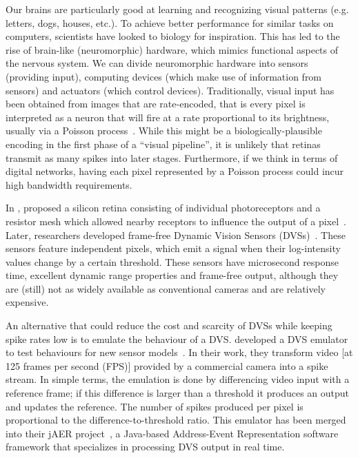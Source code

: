 \documentclass[conference]{IEEEtran}
\begin{document}
Our brains are particularly good at learning and recognizing visual patterns (e.g. letters, dogs, houses, etc.). To achieve better performance for similar tasks on computers, scientists have looked to biology for inspiration. This has led to the rise of brain-like (neuromorphic) hardware, which mimics functional aspects of the nervous system. We can divide neuromorphic hardware into sensors (providing input), computing devices (which make use of information from sensors) and actuators (which control devices). Traditionally, visual input has been obtained from images that are rate-encoded, that is every pixel is interpreted as a neuron that will fire at a rate proportional to its brightness, usually via a Poisson process~\cite{snyder2012random}. While this might be a biologically-plausible encoding in the first phase of a ``visual pipeline'', it is unlikely that retinas transmit as many spikes into later stages. Furthermore, if we think in terms of digital networks, having each pixel represented by a Poisson process could incur high bandwidth requirements. 

In \citeyear{Mead1989}, \citeauthor{Mead1989} proposed a silicon retina consisting of individual photoreceptors and a resistor mesh which allowed nearby receptors to influence the output of a pixel~\cite{Mead1989}. 
Later, researchers developed frame-free Dynamic Vision Sensors (DVSs)~\cite{delbruckDVS,bernabeDVS}. These sensors feature independent pixels, which emit a signal when their log-intensity values change by a certain threshold.
These sensors have microsecond response time, excellent dynamic range properties and frame-free output, although they are (still) not as widely available as conventional cameras and are relatively expensive.

An alternative that could reduce the cost and scarcity of DVSs while keeping spike rates low is to emulate the behaviour of a DVS. \citeauthor{DVSemu} developed a DVS emulator to test behaviours for new sensor models~\cite{DVSemu}. In their work, they transform video [at 125 frames per second (FPS)] provided by a commercial camera into a spike stream. In simple terms, the emulation is done by differencing video input with a reference frame; if this difference is larger than a threshold it produces an output and updates the reference. The number of spikes produced per pixel is proportional to the difference-to-threshold ratio. This emulator has been merged into their jAER project~\cite{delbruck2008frame}, a Java-based Address-Event Representation software framework that specializes in processing DVS output in real time.
\end{document}
